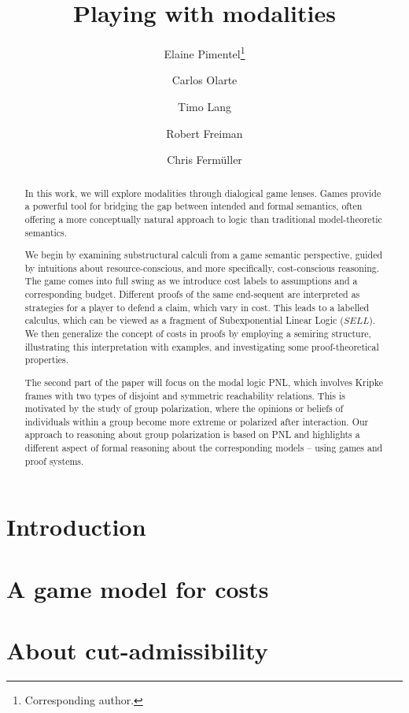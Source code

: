 \documentclass[a4paper,UKenglish,cleveref, autoref, thm-restate]{lipics-v2021}
\title{Playing with modalities}
\author{Elaine Pimentel\footnote{Corresponding author.}}{Computer Science Department UCL, UK \and \url{https://sites.google.com/site/elainepimentel/} }{e.pimentel@ucl.ac.uk}{https://orcid.org/0000-0002-7113-0801}{Pimentel has received funding from the European Union's Horizon 2020 research and innovation programme under the Marie Sk\l odowska-Curie grant agreement Number 101007627 and by the Leverhulme Project ECUMENICAL.}
\author{Carlos Olarte}{LIPN, CNRS UMR 7030, Universit\'{e} Sorbonne Paris Nord, France \and \url{https://sites.google.com/site/carlosolarte/} }{olarte@lipn.univ-paris13.fr}{https://orcid.org/0000-0002-7264-7773}{The work of Olarte has been partially supported by the SGR project PROMUEVA (BPIN
2021000100160) under the supervision of Minciencias (Ministerio de Ciencia Tecnolog\'ia e Innovaci\'on, Colombia). Olarte acknowledges also support from the NATO
Science for Peace
and Security Programme through grant number G6133 (project SymSafe). }
\author{Timo Lang}{Computer Science Department UCL, UK}{}{}{}
\author{Robert Freiman}{TU-Wien, Austria}{robert@logic.at}{}{}{}
\author{Chris Ferm\"{u}ller}{TU-Wien, Austria}{chrisf@logic.at}{}{}{}
\newcommand{\notetwo}[3]{\todo[size=\tiny,color=#1]{\texttt{\color{white} #2: #3}}}
\newcommand\co[1]{\notetwo{orange}{Carlos}{#1}}
\begin{document}
\maketitle

\begin{abstract}
In this work, we will explore modalities through dialogical game lenses. Games provide a powerful tool for bridging the gap between intended and formal semantics, often offering a more conceptually natural approach to logic than traditional model-theoretic semantics.

We begin by examining substructural calculi from a game semantic perspective, guided by intuitions about resource-conscious\co{consciousness?}, and more specifically, cost-conscious reasoning. The game comes into full swing as we introduce cost labels to assumptions and a corresponding budget. Different proofs of the same end-sequent are interpreted as strategies for a player to defend a claim, which vary in cost. This leads to a labelled calculus, which can be viewed as a fragment of Subexponential Linear Logic ($SELL$). We then generalize the concept of costs in proofs by employing a semiring structure, illustrating this interpretation with examples, and investigating some proof-theoretical properties.

The second part of the paper will focus on the modal logic PNL, which involves Kripke frames with two types of disjoint and symmetric reachability relations. This is motivated by the study of group polarization, where the opinions or beliefs of individuals within a group become more extreme or polarized after interaction. Our approach to reasoning about group polarization is based on PNL and highlights a different aspect of formal reasoning about the corresponding models -- using games and proof systems.
\end{abstract}

\section{Introduction}\label{sec:intro}


\section{A game model for costs}\label{sec:sell}

\section{About cut-admissibility}\label{sec:cut}

%
%
%
%
%
%
%
%
%


\end{document}
